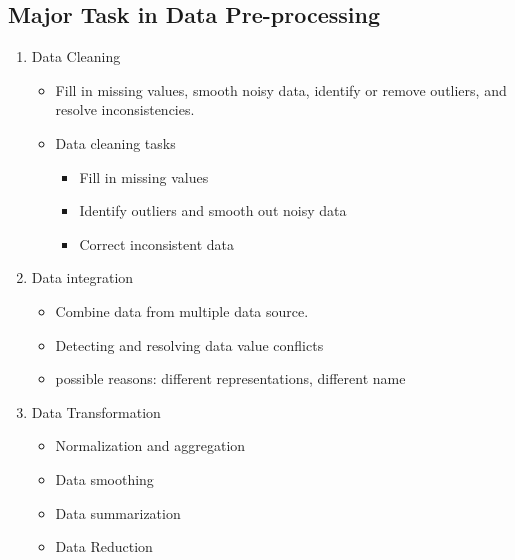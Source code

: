 \subsection{Major Task in Data Pre-processing}    
\begin{enumerate}
\item Data Cleaning
	\begin{itemize}
	\item Fill in missing values, smooth noisy data, identify or remove outliers, and resolve 		inconsistencies.
	\item Data cleaning tasks
		\begin{itemize} 	
		\item Fill in missing values
		\item Identify outliers and smooth out noisy data 
		\item Correct inconsistent data	
		\end{itemize}
	\end{itemize}
 	
\item Data integration	
	\begin{itemize}
	\item Combine data from multiple data source.
	\item Detecting and resolving data value conflicts
	\item possible reasons: different representations, different name
	\end{itemize}
   
\item Data Transformation
	\begin{itemize}
	\item Normalization and aggregation
	\item Data smoothing
	\item Data summarization
	\item Data Reduction
	\end{itemize}
\end{enumerate}



